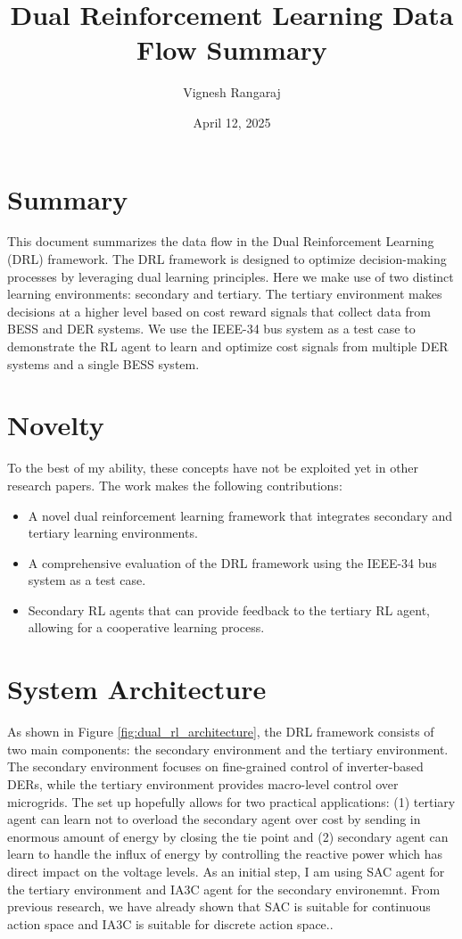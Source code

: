 \documentclass{article}
\begin{document}
\title{Dual Reinforcement Learning Data Flow Summary}
\author{Vignesh Rangaraj}
\date{April 12, 2025}

\maketitle

\section{Summary}

This document summarizes the data flow in the Dual Reinforcement Learning (DRL) framework. The DRL framework is designed to optimize decision-making processes by leveraging dual learning principles.
Here we make use of two distinct learning environments: secondary and tertiary. The tertiary environment makes decisions at a higher level based on cost reward signals that collect data from BESS and DER systems.
We use the IEEE-34 bus system as a test case to demonstrate the RL agent to learn and optimize cost signals from multiple DER systems and a single BESS system. 

\section{Novelty}
To the best of my ability, these concepts have not be exploited yet in other research papers. The work makes the following contributions:

\begin{itemize}
    \item A novel dual reinforcement learning framework that integrates secondary and tertiary learning environments.
    \item A comprehensive evaluation of the DRL framework using the IEEE-34 bus system as a test case.
    \item Secondary RL agents that can provide feedback to the tertiary RL agent, allowing for a cooperative learning process.
\end{itemize}

\section{System Architecture}

As shown in Figure \ref{fig:dual_rl_architecture}, the DRL framework consists of two main components: the secondary environment and the 
tertiary environment. The secondary environment focuses on fine-grained control of inverter-based DERs, while the tertiary environment provides macro-level control over microgrids. 
The set up hopefully allows for two practical applications: (1) tertiary agent can learn not to overload the secondary agent over cost by sending in enormous amount of energy by closing the tie point
and (2) secondary agent can learn to handle the influx of energy by controlling the reactive power which has direct impact on the voltage levels. As an initial step, I am using SAC agent for
the tertiary environment and IA3C agent for the secondary environemnt. From previous research, we have already shown that SAC is suitable for continuous action space and IA3C is suitable for discrete action space..
\end{document}
